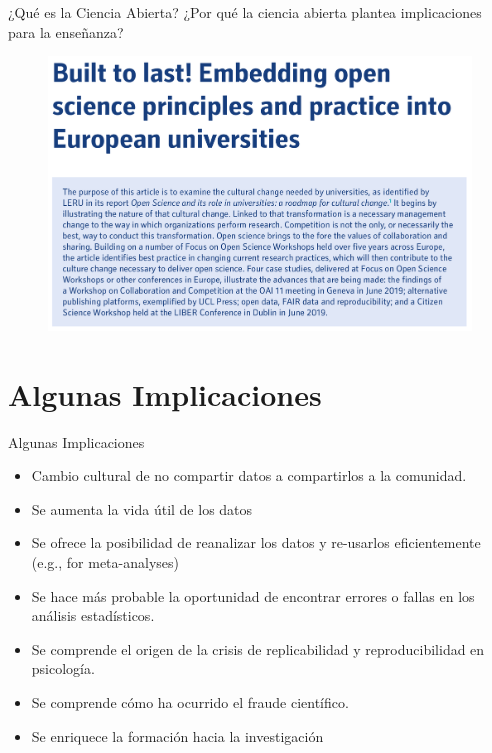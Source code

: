 \documentclass{beamer}
\begin{document}
\begin{frame}{¿Qué es la Ciencia Abierta?}
\large
¿Por qué la ciencia abierta plantea implicaciones para la enseñanza?
\begin{figure}
\includegraphics[width=.6\textwidth]{b2l.png}
\end{figure}
\cite{Ignat2021}
\end{frame}

\section{Algunas Implicaciones}
\begin{frame}{Algunas Implicaciones}
\begin{itemize}
    \item Cambio cultural de no compartir datos a compartirlos a la comunidad.
    \item Se aumenta la vida útil de los datos
    \item Se ofrece la posibilidad de reanalizar los datos y re-usarlos eficientemente (e.g., for meta-analyses)
    \item Se hace más probable la oportunidad de encontrar errores o fallas en los análisis estadísticos.
    \item Se comprende el origen de la crisis de replicabilidad y reproducibilidad en psicología.
    \item Se comprende cómo ha ocurrido el fraude científico.
    \item Se enriquece la formación hacia la investigación
\end{itemize}    
\end{frame}
\end{document}
